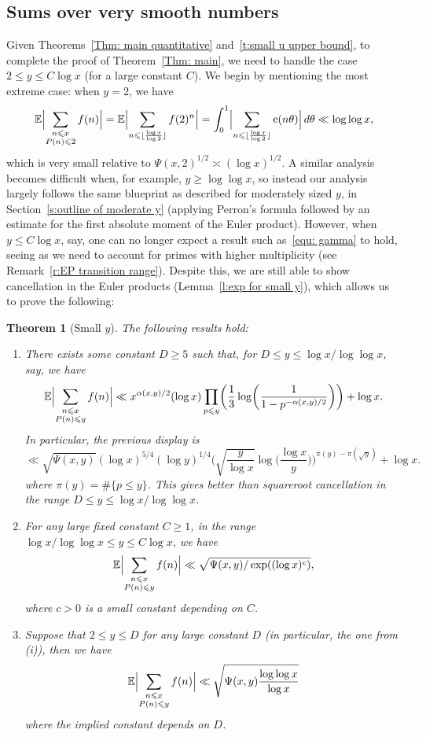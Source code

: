 \documentclass[12pt,a4paper,reqno]{amsart}
\numberwithin{equation}{section}
\def\E{\mathbb E}
\def\leq {\leqslant}
\newtheorem{theorem}{Theorem}[section]
\theoremstyle{remark}
\theoremstyle{definition}
\numberwithin{equation}{section}
\theoremstyle{remark}
\def\E{\mathbb E}
\begin{document}
\subsection{Sums over very smooth numbers}\label{s: small y explained}
Given Theorems~\ref{Thm: main quantitative} and~\ref{t:small u upper bound}, to complete the proof of Theorem~\ref{Thm: main}, we need to handle the case $2 \leq y \leq C \log x$ (for a large constant $C$). We begin by mentioning the most extreme case: when $y=2$, we have
\[
\E \Bigl| \sum_{\substack{n \leq x \\ P(n) \leq 2}} f(n) \Bigr| = \E \Bigl| \sum_{n \leq \lfloor \frac{\log x}{\log 2} \rfloor} f(2)^n \Bigr| = \int_0^1 \Bigl| \sum_{n \leq \lfloor \frac{\log x}{\log 2} \rfloor} \mathrm{e} (n \theta) \Bigr| \, d \theta \ll \log \log x,
\]
which is very small relative to $\Psi(x,2)^{1/2} \asymp (\log x)^{1/2}$. A similar analysis becomes difficult when, for example, $y \geq \log \log x$, so instead our analysis largely follows the same blueprint as described for moderately sized $y$, in Section~\ref{s:outline of moderate y} (applying Perron's formula followed by an estimate for the first absolute moment of the Euler product). However, when $y \leq C \log x$, say, one can no longer expect a result such as~\eqref{equ: gamma} to hold, seeing as we need to account for primes with higher multiplicity (see Remark~\ref{r:EP transition range}). Despite this, we are still able to show cancellation in the Euler products (Lemma~\ref{l:exp for small y}), which allows us to prove the following:
\begin{theorem}[Small $y$]\label{t: small y} 
The following results hold:
\begin{enumerate}[label=(\roman*)]
\item There exists some constant $D \geq 5$ such that, for $D \leq y \leq \log x/\log \log x$, say, we have
\[
\E \Bigl| \sum_{\substack{n \leq x \\ P(n) \leq y}} f(n) \Bigr| \ll  x^{\alpha(x,y)/2} (\log x) \prod_{p \leq y} \biggl( \frac{1}{3} \log \biggl( \frac{1}{1-p^{-\alpha(x,y)/2}} \biggr) \biggr) + \log x . 
\]
In particular, the previous display is
\[
\ll  \sqrt{\Psi(x,y)} (\log x)^{5/4} (\log y)^{1/4} \biggl( \sqrt{\frac{y}{\log x}} \log \biggl( \frac{\log x}{y} \biggr) \biggr)^{\pi(y) - \pi(\sqrt{y})} + \log x . 
\]
where $\pi (y) = \# \{ p \leq y \}$. This gives better than squareroot cancellation in the range $D \leq y \leq \log x/\log \log x$.
\item For any large fixed constant $C \geq 1$, in the range $\log x / \log \log x \leq y \leq C \log x$, we have
\[
\E \Bigl| \sum_{\substack{n \leq x \\ P(n) \leq y}} f(n) \Bigr| \ll \sqrt{\Psi (x,y)/\exp ((\log x)^{c})}, 
\]
where $c > 0$ is a small constant depending on $C$.
\item Suppose that $2 \leq y \leq D$ for any large constant $D$ (in particular, the one from (i)), then we have
\[
\E \Bigl| \sum_{\substack{n \leq x \\ P(n) \leq y}} f(n) \Bigr| \ll \sqrt{\Psi(x,y)\frac{\log \log x}{\log x}}
\]
where the implied constant depends on $D$.
\end{enumerate}

\end{theorem}
\end{document}
